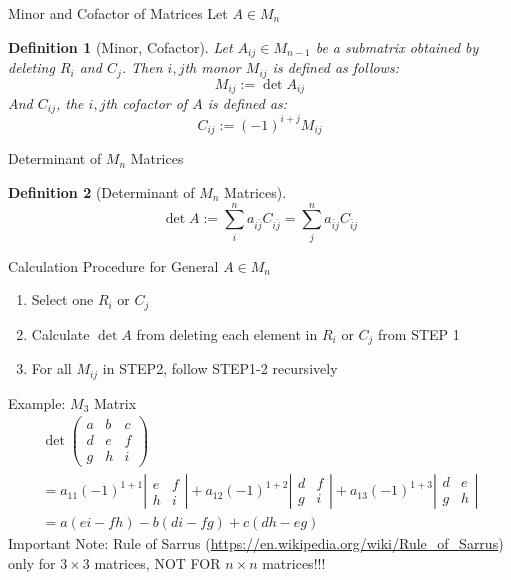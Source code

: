 \documentclass[a4paper,11pt]{article}
\newtheorem{defn}{Definition}
\begin{document}
\begin{frame}[t]{Minor and Cofactor of Matrices}
	Let $A\in M_n$
	\begin{defn}
		[Minor, Cofactor]
		Let $A_{ij}\in M_{n-1}$ be a submatrix obtained by deleting $R_i$ and $C_j$. Then $i,j$th monor $M_{ij}$ is defined as follows:
		\[
			M_{ij}:= \det A_{ij}
		\]
		And $C_{ij}$, the $i,j$th cofactor of $A$ is defined as:
		\[
			C_{ij}:= (-1)^{i+j}M_{ij}
		\]
	\end{defn}

\end{frame}
\begin{frame}[t]{Determinant of $M_n$ Matrices}
	\begin{defn}
		[Determinant of $M_n$ Matrices]
		\[
			\det A := \sum_i^n a_{i \bar j}C_{i \bar j} = \sum_j^n a_{\bar i j}C_{\bar i j}
		\]
	\end{defn}
	\begin{block}
		{Calculation Procedure for General $A\in M_n$}
		\begin{enumerate}[STEP 1:]
			\item Select one $R_i$ or $C_j$
			\item Calculate $\det A$ from deleting each element in $R_i$ or $C_j$ from STEP 1
			\item For all $M_{ij}$ in STEP2, follow STEP1-2 recursively
		\end{enumerate}
	\end{block}
\end{frame}

\begin{frame}[t]{Example: $M_3$ Matrix}
	\begin{multline*}
		\det \begin{pmatrix}
			a &b & c \\
			d&e&f\\
			g&h&i
		\end{pmatrix} 
		\\= a_{11} (-1)^{1+1}\left\vert \begin{matrix}
			e&f\\
			h&i
		\end{matrix}\right\vert + a_{12} (-1)^{1+2}\left\vert \begin{matrix}
			d&f\\
			g&i
		\end{matrix}\right\vert + a_{13} (-1)^{1+3}\left\vert \begin{matrix}
			d&e\\
			g&h
		\end{matrix}\right\vert 
		\\= a(ei-fh)-b(di-fg)+c(dh-eg)
	\end{multline*}
	Important Note: Rule of Sarrus (\url{https://en.wikipedia.org/wiki/Rule_of_Sarrus}) only for $3\times 3$ matrices, NOT FOR $n\times n$ matrices!!!
\end{frame}
\end{document}
